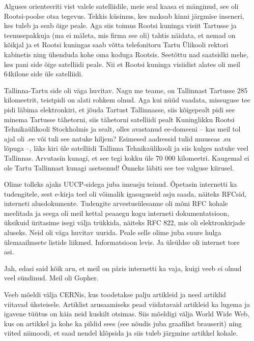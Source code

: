 Alguses orienteeriti vist valele satelliidile, meie seal kaasa ei mänginud, see 
oli Rootsi-poolse otsa tegevus. Tekkis küsimus, kes maksab kinni
järgmise inseneri, kes tuleb ja seab õige peale. Aga siis toimus
Rootsi kuninga visiit Tartusse ja teenusepakkuja (ma ei mäleta, mis firma 
see oli) tahtis näidata, et nemad on kõikjal ja et Rootsi kuningas saab võtta 
telefonitoru Tartu Ülikooli rektori kabinetis ning ühenduda kohe oma koduga 
Rootsis. Seetõttu nad saatsidki mehe, kes pani side õige satelliidi peale. 
Nii et Rootsi kuninga visiidist alates oli meil 64kilone side üle satelliidi. 

Tallinna-Tartu side oli väga huvitav. Nagu me teame, on Tallinnast Tartusse 285 kilomeetrit, teistpidi on alati rohkem olnud. Aga kui 
nüüd vaadata, missuguse tee pidi läbima elektronkiri, et jõuda Tartust 
Tallinnasse, siis kõigepealt pidi see minema Tartusse tähetorni, siis tähetorni 
satelliidi pealt Kuninglikku Rootsi Tehnikaülikooli Stockholmis ja sealt, olles 
avastanud ee-domeeni -- kas meil tol ajal oli .ee või tuli see natuke hiljem? 
Esimesed aadressid tulid muuseas .su lõpuga --, läks kiri üle satelliidi 
Tallinna Tehnikaülikooli ja siis kulges natuke veel Tallinnas. Arvutasin kunagi, et see tegi
kokku üle 70 000 kilomeetri\label{sisu!70k}. Kaugemal ei ole Tartu 
Tallinnast kunagi asetsenud! Õnneks läbiti see tee valguse kiirusel. 


Olime tolleks ajaks UUCP-sidega juba imeasju teinud. 
Õpetasin internetti ka tudengitele, sest e-kirja teel oli 
võimalik igasuguseid asju saada, näiteks RFCsid, interneti 
alusdokumente. Tudengite 
arvestusülesanne oli mõni RFC kohale meelitada ja seega oli meil kettal 
peaaegu kogu interneti dokumentatsioon, üksikuid üritasime isegi 
välja trükkida, näiteks RFC 822, mis oli elektronkirjade aluseks. Neid oli väga huvitav uurida. Peale selle olime juba suure hulga ülemaailmsete 
listide liikmed. Informatsioon levis. Ja üleüldse oli internet tore asi. 


Jah, edasi said kõik aru, et meil on päris internetti ka vaja, kuigi 
veeb ei olnud veel sündinud. Meil oli Gopher.

Veeb mõeldi välja CERNis, kus
toodetakse palju artikleid ja need artiklid viitavad üksteisele. 
Artiklist arusaamiseks pead viidatavaid artikleid ka lugema ja 
igavene tüütus on käia neid kuskilt otsimas. Siis mõeldigi välja 
World Wide Web, kus on artikkel ja kohe ka pildid sees (see nõudis 
juba graafilist brauserit) ning viited niimoodi, et saad nendel klõpsida 
ja siis tuleb järgmine artikkel kohale. 

